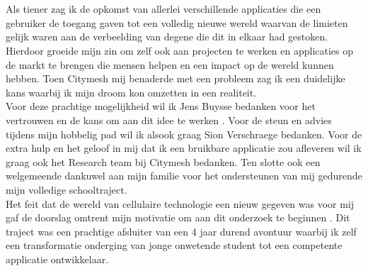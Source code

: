 
\chapter*{}%
\label{ch:voorwoord}


Als tiener zag ik de opkomst van allerlei verschillende applicaties die een gebruiker de toegang gaven tot een volledig nieuwe wereld waarvan de limieten gelijk waren aan de verbeelding van degene die dit in elkaar had gestoken. Hierdoor groeide mijn zin om zelf ook aan projecten te werken en applicaties op de markt te brengen die mensen helpen en een impact op de wereld kunnen hebben. Toen Citymesh mij benaderde met een probleem zag ik een duidelijke kans waarbij ik mijn droom kon omzetten in een realiteit. \\

Voor deze prachtige mogelijkheid wil ik Jens Buysse bedanken voor het vertrouwen en de kans om aan dit idee te werken . Voor de steun en advies tijdens mijn hobbelig pad wil ik alsook graag Sion Verschraege bedanken. Voor de extra hulp en het geloof in mij dat ik een bruikbare applicatie zou afleveren wil ik graag ook het Research team bij Citymesh bedanken. Ten slotte ook een welgemeende dankuwel aan mijn familie voor het ondersteunen van mij gedurende mijn volledige schooltraject. \\

Het feit dat de wereld van cellulaire technologie een nieuw gegeven was voor mij gaf de doorslag omtrent mijn motivatie om aan dit onderzoek te beginnen . Dit traject was een prachtige afsluiter van een 4 jaar durend avontuur waarbij ik zelf een transformatie onderging van jonge onwetende student  tot een competente applicatie ontwikkelaar.